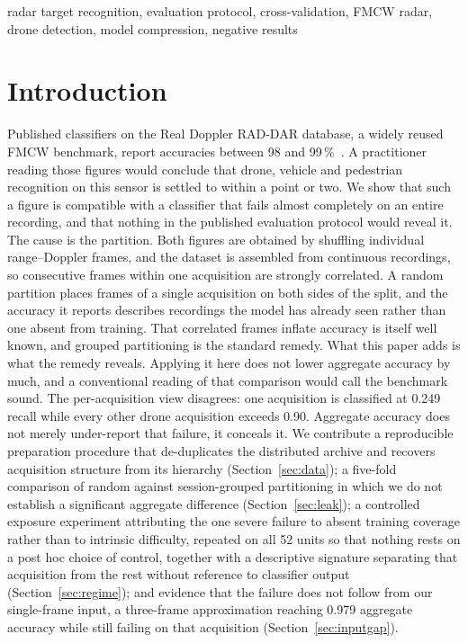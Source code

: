 \documentclass[conference]{IEEEtran}
\begin{document}
\begin{IEEEkeywords}
radar target recognition, evaluation protocol, cross-validation, FMCW radar, drone detection, model compression, negative results
\end{IEEEkeywords}

\section{Introduction}

Published classifiers on the Real Doppler RAD-DAR database, a widely reused FMCW benchmark, report accuracies between 98 and 99\,\%~\cite{roldan2020,zhang2025}. A practitioner reading those figures would conclude that drone, vehicle and pedestrian recognition on this sensor is settled to within a point or two. We show that such a figure is compatible with a classifier that fails almost completely on an entire recording, and that nothing in the published evaluation protocol would reveal it.
The cause is the partition. Both figures are obtained by shuffling individual range--Doppler frames, and the dataset is assembled from continuous recordings, so consecutive frames within one acquisition are strongly correlated. A random partition places frames of a single acquisition on both sides of the split, and the accuracy it reports describes recordings the model has already seen rather than one absent from training.
That correlated frames inflate accuracy is itself well known, and grouped partitioning is the standard remedy. What this paper adds is what the remedy reveals. Applying it here does not lower aggregate accuracy by much, and a conventional reading of that comparison would call the benchmark sound. The per-acquisition view disagrees: one acquisition is classified at 0.249 recall while every other drone acquisition exceeds 0.90. Aggregate accuracy does not merely under-report that failure, it conceals it.
We contribute a reproducible preparation procedure that de-duplicates the distributed archive and recovers acquisition structure from its hierarchy (Section~\ref{sec:data}); a five-fold comparison of random against session-grouped partitioning in which we do not establish a significant aggregate difference (Section~\ref{sec:leak}); a controlled exposure experiment attributing the one severe failure to absent training coverage rather than to intrinsic difficulty, repeated on all 52 units so that nothing rests on a post hoc choice of control, together with a descriptive signature separating that acquisition from the rest without reference to classifier output (Section~\ref{sec:regime}); and evidence that the failure does not follow from our single-frame input, a three-frame approximation reaching 0.979 aggregate accuracy while still failing on that acquisition (Section~\ref{sec:inputgap}).
\end{document}
